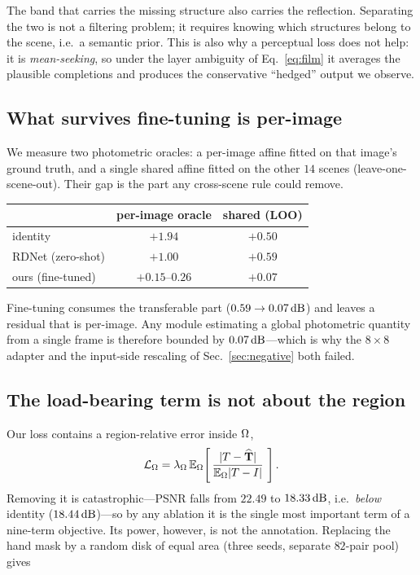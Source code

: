 The band that carries the missing structure also carries the reflection. Separating the
two is not a filtering problem; it requires knowing which structures belong to the scene,
i.e.\ a semantic prior. This is also why a perceptual loss does not help: it is
\emph{mean-seeking}, so under the layer ambiguity of Eq.~\eqref{eq:film} it averages the
plausible completions and produces the conservative ``hedged'' output we observe.

\subsection{What survives fine-tuning is per-image}
\label{sec:photometric}

We measure two photometric oracles: a per-image affine fitted on that image's ground
truth, and a single shared affine fitted on the other $14$ scenes (leave-one-scene-out).
Their gap is the part any cross-scene rule could remove.

\begin{center}
\small
\setlength{\tabcolsep}{4pt}
\begin{tabular}{lcc}
\toprule
 & per-image oracle & shared (LOO) \\
\midrule
identity & $+1.94$ & $+0.50$ \\
RDNet (zero-shot) & $+1.00$ & $+0.59$ \\
ours (fine-tuned) & $+0.15$--$0.26$ & $+0.07$ \\
\bottomrule
\end{tabular}
\end{center}

Fine-tuning consumes the transferable part ($0.59\rightarrow0.07\,\mathrm{dB}$) and leaves a
residual that is per-image. Any module estimating a global photometric quantity from a
single frame is therefore bounded by $0.07\,\mathrm{dB}$---which is why the $8{\times}8$ adapter and
the input-side rescaling of Sec.~\ref{sec:negative} both failed.

\subsection{The load-bearing term is not about the region}
\label{sec:axis3}

Our loss contains a region-relative error inside $\Omega$,
\begin{equation}
\mathcal{L}_{\Omega}=\lambda_{\Omega}\,\mathbb{E}_{\Omega}\!\left[\,
\frac{|T-\widehat{\mathbf{T}}|}{\mathbb{E}_{\Omega}|T-I|}\ \right].
\label{eq:lom}
\end{equation}
Removing it is catastrophic---PSNR falls from $22.49$ to $18.33\,\mathrm{dB}$, i.e.\ \emph{below}
identity ($18.44\,\mathrm{dB}$)---so by any ablation it is the single most important term of a
nine-term objective. Its power, however, is not the annotation. Replacing the hand mask by
a random disk of equal area (three seeds, separate $82$-pair pool) gives

